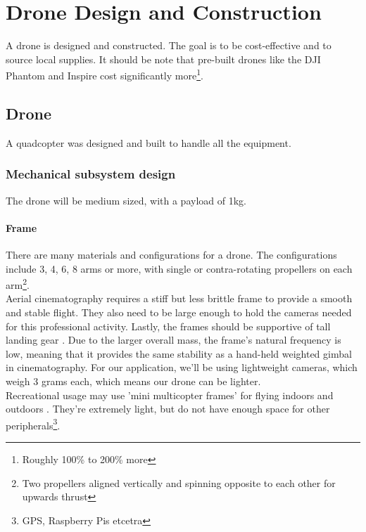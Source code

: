 \chapter{Drone Design and Construction}

A drone is designed and constructed. The goal is to be cost-effective and to source local supplies. It should be note that pre-built drones like the DJI Phantom and Inspire cost significantly more\footnote{Roughly 100\% to 200\% more}.

\section{Drone}

A quadcopter was designed and built to handle all the equipment.

\subsection{Mechanical subsystem design}

The drone will be medium sized, with a payload of 1kg.

\subsubsection{Frame}

There are many materials and configurations for a drone. The configurations include 3, 4, 6, 8 arms or more, with single or contra-rotating propellers on each arm\footnote{Two propellers aligned vertically and spinning opposite to each other for upwards thrust}. \\

Aerial cinematography requires a stiff but less brittle frame to provide a smooth and stable flight. They also need to be large enough to hold the cameras needed for this professional activity. Lastly, the frames should be supportive of tall landing gear \cite{frame}. Due to the larger overall mass, the frame's natural frequency is low, meaning that it provides the same stability as a hand-held weighted gimbal in cinematography. For our application, we'll be using lightweight cameras, which weigh 3 grams each, which means our drone can be lighter.\\

Recreational usage may use 'mini multicopter frames' for flying indoors and outdoors \cite{frame}. They're extremely light, but do not have enough space for other peripherals\footnote{GPS, Raspberry Pis etcetra}.\\

